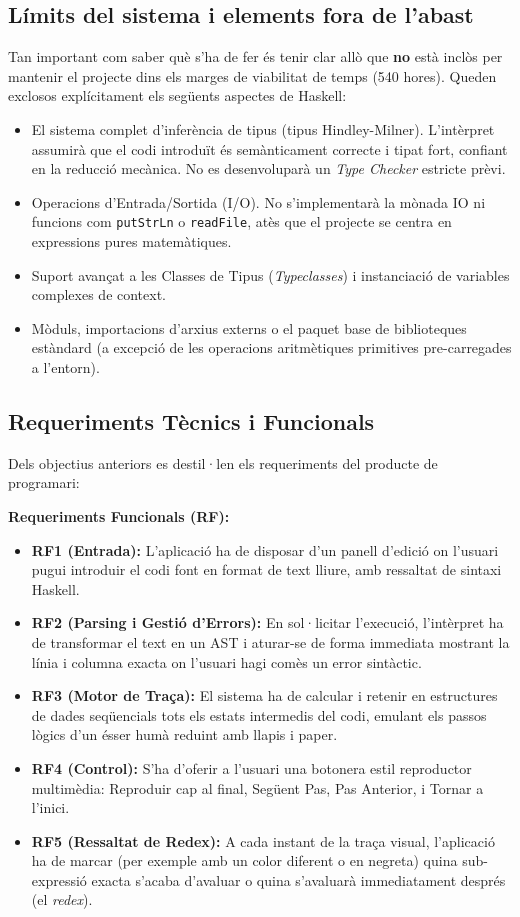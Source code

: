 \subsection{Límits del sistema i elements fora de l'abast}
Tan important com saber què s'ha de fer és tenir clar allò que \textbf{no} està inclòs per mantenir el projecte dins els marges de viabilitat de temps (540 hores). Queden exclosos explícitament els següents aspectes de Haskell:
\begin{itemize}
    \item El sistema complet d'inferència de tipus (tipus Hindley-Milner). L'intèrpret assumirà que el codi introduït és semànticament correcte i tipat fort, confiant en la reducció mecànica. No es desenvoluparà un \textit{Type Checker} estricte prèvi.
    \item Operacions d'Entrada/Sortida (I/O). No s'implementarà la mònada IO ni funcions com \texttt{putStrLn} o \texttt{readFile}, atès que el projecte se centra en expressions pures matemàtiques.
    \item Suport avançat a les Classes de Tipus (\textit{Typeclasses}) i instanciació de variables complexes de context.
    \item Mòduls, importacions d'arxius externs o el paquet base de biblioteques estàndard (a excepció de les operacions aritmètiques primitives pre-carregades a l'entorn).
\end{itemize}

\subsection{Requeriments Tècnics i Funcionals}
Dels objectius anteriors es destil·len els requeriments del producte de programari:

\textbf{Requeriments Funcionals (RF):}
\begin{itemize}
    \item \textbf{RF1 (Entrada):} L'aplicació ha de disposar d'un panell d'edició on l'usuari pugui introduir el codi font en format de text lliure, amb ressaltat de sintaxi Haskell.
    \item \textbf{RF2 (Parsing i Gestió d'Errors):} En sol·licitar l'execució, l'intèrpret ha de transformar el text en un AST i aturar-se de forma immediata mostrant la línia i columna exacta on l'usuari hagi comès un error sintàctic.
    \item \textbf{RF3 (Motor de Traça):} El sistema ha de calcular i retenir en estructures de dades seqüencials tots els estats intermedis del codi, emulant els passos lògics d'un ésser humà reduint amb llapis i paper.
    \item \textbf{RF4 (Control):} S'ha d'oferir a l'usuari una botonera estil reproductor multimèdia: Reproduir cap al final, Següent Pas, Pas Anterior, i Tornar a l'inici.
    \item \textbf{RF5 (Ressaltat de Redex):} A cada instant de la traça visual, l'aplicació ha de marcar (per exemple amb un color diferent o en negreta) quina sub-expressió exacta s'acaba d'avaluar o quina s'avaluarà immediatament després (el \textit{redex}).
\end{itemize}

